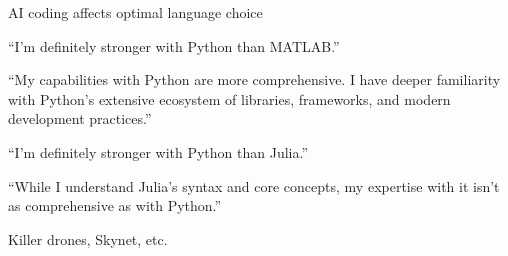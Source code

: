 \begin{frame}{AI coding affects optimal language choice}
    
    ``I'm definitely stronger with Python than MATLAB.''

    \vspace{0.5em}
    ``My capabilities with Python
    are more comprehensive. I have deeper familiarity with Python's extensive
    ecosystem of libraries, frameworks, and modern development practices.''

    \vspace{0.5em}
    ``I'm definitely stronger with Python than Julia.''

    \vspace{0.5em}
    ``While I understand Julia's syntax and core concepts, my expertise with it
    isn't as comprehensive as with Python.''

\end{frame}


\begin{frame}{Killer drones, Skynet, etc.}

    \begin{figure}
       \centering
    \end{figure}

\end{frame}


%     
%
%
%
%

